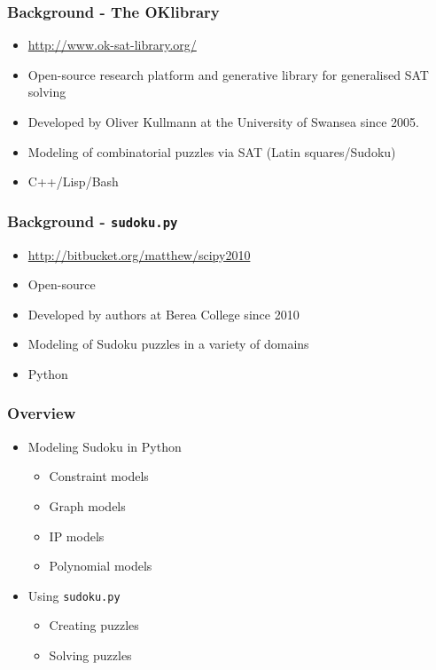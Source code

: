 \documentclass{beamer}
\title{\talktitle}
\author{\Us}
\date{\talkdate}
\begin{document}
\begin{frame}
  \titlepage
  \conferencebanner
\end{frame}

\begin{frame}
\frametitle{Background - The OKlibrary}
 \begin{itemize}
  \item<1-> \url{http://www.ok-sat-library.org/}
  \item<2-> Open-source research platform and generative library for generalised SAT solving
  \item<3-> Developed by Oliver Kullmann at the University of Swansea since 2005.
  \item<4-> Modeling of combinatorial puzzles via SAT (Latin squares/Sudoku)
  \item<5-> C++/Lisp/Bash
 \end{itemize}
\end{frame}

\begin{frame}
\frametitle{Background - \texttt{sudoku.py}}
 \begin{itemize}
  \item<1-> \url{http://bitbucket.org/matthew/scipy2010}
  \item<2-> Open-source 
  \item<3-> Developed by authors at Berea College since 2010
  \item<4-> Modeling of Sudoku puzzles in a variety of domains
  \item<5-> Python
 \end{itemize}
\end{frame}

\begin{frame}
\frametitle{Overview}
 \begin{itemize}
  \item<1-> {Modeling Sudoku in Python
    \begin{itemize}
      \item<2-> Constraint models
      \item<3-> Graph models
      \item<4-> IP models
      \item<5-> Polynomial models
    \end{itemize}}
  \item<6-> {Using \texttt{sudoku.py} 
    \begin{itemize}
      \item<7-> Creating puzzles
      \item<8-> Solving puzzles
    \end{itemize}}
 \end{itemize}
\end{frame}
\end{document}
